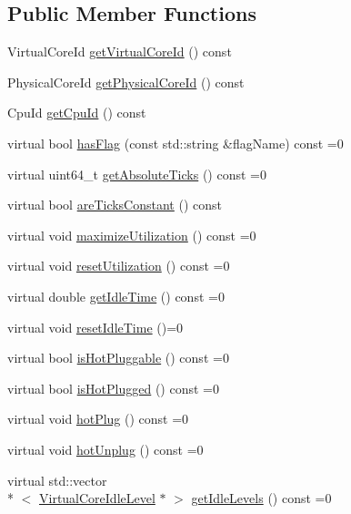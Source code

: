 \subsection*{Public Member Functions}
\begin{DoxyCompactItemize}
\item 
Virtual\-Core\-Id \hyperlink{classmammut_1_1topology_1_1VirtualCore_ae9b5118e3e28805d4d9b3429d1b215a7}{get\-Virtual\-Core\-Id} () const 
\item 
Physical\-Core\-Id \hyperlink{classmammut_1_1topology_1_1VirtualCore_a2af7ef4acf15330f86050c2aff354a71}{get\-Physical\-Core\-Id} () const 
\item 
Cpu\-Id \hyperlink{classmammut_1_1topology_1_1VirtualCore_aa2c26a312e610dd2f6e9aa8fbcd35223}{get\-Cpu\-Id} () const 
\item 
virtual bool \hyperlink{classmammut_1_1topology_1_1VirtualCore_aa9f4400708c97197f66bcd11aa0eb990}{has\-Flag} (const std\-::string \&flag\-Name) const =0
\item 
virtual uint64\-\_\-t \hyperlink{classmammut_1_1topology_1_1VirtualCore_a0b1ac9c138d1ed5e8eceb38e619e1e65}{get\-Absolute\-Ticks} () const =0
\item 
virtual bool \hyperlink{classmammut_1_1topology_1_1VirtualCore_a82bf6ba883ee5bdc4ef4b3c0fb300207}{are\-Ticks\-Constant} () const 
\item 
virtual void \hyperlink{classmammut_1_1topology_1_1VirtualCore_ac4e3a17bc401689c387f27a90e24daf5}{maximize\-Utilization} () const =0
\item 
virtual void \hyperlink{classmammut_1_1topology_1_1VirtualCore_a94374b13113f0294c5178b6fc275ecc0}{reset\-Utilization} () const =0
\item 
virtual double \hyperlink{classmammut_1_1topology_1_1VirtualCore_ad4a33cf2323e7b05537485e4b08a4f12}{get\-Idle\-Time} () const =0
\item 
virtual void \hyperlink{classmammut_1_1topology_1_1VirtualCore_a8fc6a3a4882ca369e37a3a9f0f668d9c}{reset\-Idle\-Time} ()=0
\item 
virtual bool \hyperlink{classmammut_1_1topology_1_1VirtualCore_ab8eb88bee673244367a5394de87142d5}{is\-Hot\-Pluggable} () const =0
\item 
virtual bool \hyperlink{classmammut_1_1topology_1_1VirtualCore_a61bd18dbc9bd35f6b22e9bbd7947427d}{is\-Hot\-Plugged} () const =0
\item 
virtual void \hyperlink{classmammut_1_1topology_1_1VirtualCore_a7674d352e60bb8d9c183ca54f62b383d}{hot\-Plug} () const =0
\item 
virtual void \hyperlink{classmammut_1_1topology_1_1VirtualCore_a1e8ce49fd0885331533fa85ad7504a9d}{hot\-Unplug} () const =0
\item 
virtual std\-::vector\\*
$<$ \hyperlink{classmammut_1_1topology_1_1VirtualCoreIdleLevel}{Virtual\-Core\-Idle\-Level} $\ast$ $>$ \hyperlink{classmammut_1_1topology_1_1VirtualCore_a841dd64b1b74b28a0533cc1aa9d8cb84}{get\-Idle\-Levels} () const =0
\end{DoxyCompactItemize}
